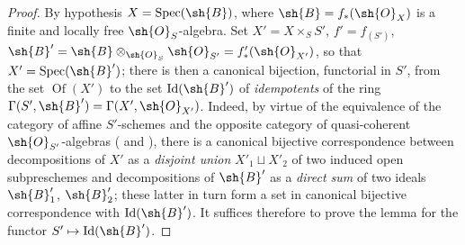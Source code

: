 \begin{proof}
By hypothesis $X=\operatorname{Spec}(\sh{B})$, where $\sh{B}=f_*(\sh{O}_X)$ is a finite and locally free $\sh{O}_S$-algebra.
Set $X'=X\times_S S'$, $f'=f_{(S')}$, $\sh{B}'=\sh{B}\otimes_{\sh{O}_S}\sh{O}_{S'}=f'_*(\sh{O}_{X'})$, so that $X'=\operatorname{Spec}(\sh{B}')$;
there is then a canonical bijection, functorial in $S'$, from the set $\operatorname{Of}(X')$ to the set $\operatorname{Id}(\sh{B}')$ of \emph{idempotents} of the ring $\Gamma(S',\sh{B}')=\Gamma(X',\sh{O}_{X'})$.
Indeed, by virtue of the equivalence of the category of affine $S'$-schemes and the opposite category of quasi-coherent $\sh{O}_{S'}$-algebras ( and ), there is a canonical bijective correspondence between decompositions of $X'$ as a \emph{disjoint union} $X'_1\sqcup X'_2$ of two induced open subpreschemes and decompositions of $\sh{B}'$ as a \emph{direct sum} of two ideals $\sh{B}'_1$, $\sh{B}'_2$;
these latter in turn form a set in canonical bijective correspondence with $\operatorname{Id}(\sh{B}')$.
It suffices therefore to prove the lemma for the functor $S'\mapsto\operatorname{Id}(\sh{B}')$.


\end{proof}
